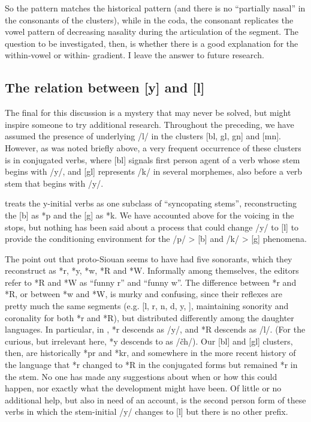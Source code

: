 \documentclass[output=paper]{LSP/langsci}
\begin{document}
So the  pattern matches the historical pattern (and there is no ``partially nasal'' in the consonants of the clusters), while in the coda, the consonant replicates the vowel pattern of decreasing nasality during the articulation of the segment. The question to be investigated, then, is whether there is a good explanation for the within-vowel or within-  gradient. I leave the answer to future research.

\subsection{The relation between [y] and [l]}

The final  for this discussion is a mystery that may never be solved, but might inspire someone to try additional research. Throughout the preceding, we have assumed the presence of underlying /l/ in the clusters [bl, gl, gn] and [mn]. However, as was noted briefly above, a very frequent occurrence of these clusters is in conjugated verbs, where [bl] signals first person agent of a verb whose stem begins with /y/, and [gl] represents /k/ in several morphemes, also before a verb stem that begins with /y/.

\citet{Koontz1991} treats the y-initial verbs as one subclass of ``syncopating stems'', reconstructing the [b] as *p and the [g] as *k. We have accounted above for the voicing in the stops, but nothing has been said about a process that could change /y/ to [l] to provide the conditioning environment for the /p/ > [b] and /k/ > [g] phenomena.

The  \citep{RankinEtAl1998,Rankinetal2015AccessSeptember} point out that proto-Siouan seems to have had five sonorants, which they reconstruct as *r, *y, *w, *R and *W. Informally among themselves, the  editors refer to *R and *W as ``funny r'' and ``funny w''. The difference between *r and *R, or between *w and *W, is murky and confusing, since their reflexes are pretty much the same segments (e.g. [l, r, n, d, y, ], maintaining sonority and coronality for both *r and *R), but distributed differently among the daughter languages. In particular, in , *r descends as /y/, and *R descends as /l/. (For the curious, but irrelevant here, *y descends to  as /\v{c}h/). Our [bl] and [gl] clusters, then, are historically *pr and *kr, and somewhere in the more recent history of the language that *r changed to *R in the conjugated forms but remained *r in the stem. No one has made any suggestions about when or how this could happen, nor exactly what the development might have been. Of little or no additional help, but also in need of an account, is the second person form of these verbs in which the stem-initial /y/ changes to [l] but there is no other prefix.
\end{document}
